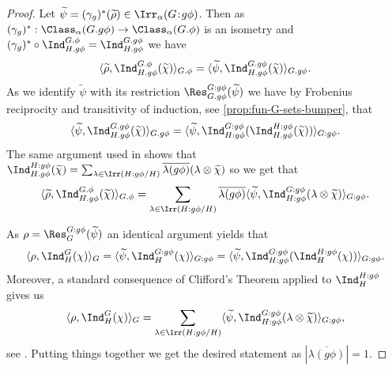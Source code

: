 \documentclass[eqthmnum,nocolour,skinny]{jt-calcs}
\newcommand\sd{
	\mathchoice{\mkern1.5mu}{\mkern1.5mu}{}{}%
	{:}%
	\mathchoice{\mkern1.5mu}{\mkern1.5mu}{}{}
}
\begin{document}
\begin{proof}
Let $\widetilde{\psi} = (\gamma_g)^*(\widetilde{\rho}) \in \Irr_{\alpha}(G\sd g\phi)$. Then as $(\gamma_g)^* : \Class_{\alpha}(G.g\phi) \to \Class_{\alpha}(G.\phi)$ is an isometry and $(\gamma_g)^*\circ\Ind_{H.g\phi}^{G.\phi} = \Ind_{H.g\phi}^{G.g\phi}$ we have
\begin{equation*}
\langle \widetilde{\rho},\Ind_{H.g\phi}^{G.\phi}(\widetilde{\chi})\rangle_{G.\phi} = \langle \widetilde{\psi},\Ind_{H.g\phi}^{G.g\phi}(\widetilde{\chi})\rangle_{G.g\phi}.
\end{equation*}
As we identify $\widetilde{\psi}$ with its restriction $\Res_{G.g\phi}^{G\sd g\phi}(\widetilde{\psi})$ we have by Frobenius reciprocity and transitivity of induction, see \cref{prop:fun-G-sets-bumper}, that
\begin{equation*}
\langle \widetilde{\psi},\Ind_{H.g\phi}^{G.g\phi}(\widetilde{\chi})\rangle_{G.g\phi} = \langle \widetilde{\psi}, \Ind_{H\sd g\phi}^{G\sd g\phi}(\Ind_{H.g\phi}^{H\sd g\phi}(\widetilde{\chi}))\rangle_{G\sd g\phi}.
\end{equation*}
The same argument used in \cite[1.3]{bonnafe:2006:sln} shows that $\Ind_{H.g\phi}^{H\sd g\phi}(\widetilde{\chi}) = \sum_{\lambda \in \Irr(H\sd g\phi/H)} \overline{\lambda(g\phi)}(\lambda\otimes\widetilde{\chi})$ so we get that
\begin{equation*}
\langle \widetilde{\rho},\Ind_{H.g\phi}^{G.\phi}(\widetilde{\chi})\rangle_{G.\phi} = \sum_{\lambda \in \Irr(H\sd g\phi/H)} \overline{\lambda(g\phi)}\langle \widetilde{\psi}, \Ind_{H\sd g\phi}^{G\sd g\phi}(\lambda \otimes \widetilde{\chi})\rangle_{G\sd g\phi}.
\end{equation*}

As $\rho = \Res_G^{G\sd g\phi}(\widetilde{\psi})$ an identical argument yields that
\begin{equation*}
\langle \rho,\Ind_H^G(\chi)\rangle_G = \langle \widetilde{\psi},\Ind_H^{G\sd g\phi}(\chi)\rangle_{G\sd g\phi} = \langle \widetilde{\psi},\Ind_{H\sd g\phi}^{G\sd g\phi}(\Ind_H^{H:g\phi}(\chi))\rangle_{G\sd g\phi}.
\end{equation*}
Moreover, a standard consequence of Clifford's Theorem applied to $\Ind_H^{H:g\phi}$ gives us
\begin{equation*}
\langle \rho,\Ind_H^G(\chi)\rangle_G = \sum_{\lambda \in \Irr(H\sd g\phi/H)} \langle \widetilde{\psi},\Ind_{H\sd g\phi}^{G\sd g\phi}(\lambda \otimes \widetilde{\chi}) \rangle_{G\sd g\phi},
\end{equation*}
see \cite[Cor.~6.17]{isaacs:2006:character-theory-of-finite-groups}. Putting things together we get the desired statement as $|\overline{\lambda(g\phi)}| = 1$.
\end{proof}
\end{document}
